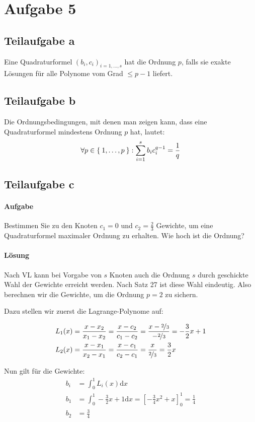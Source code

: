 \section*{Aufgabe 5}
\subsection*{Teilaufgabe a}
Eine Quadraturformel $(b_i, c_i)_{i=1, \dots, s}$ hat die Ordnung
$p$, falls sie exakte Lösungen für alle Polynome vom Grad $\leq p -1$
liefert.

\subsection*{Teilaufgabe b}
Die Ordnungsbedingungen, mit denen man zeigen kann, dass eine Quadraturformel
mindestens Ordnung $p$ hat, lautet:
\[\forall p \in \Set{1, \dots, p}: \sum_{i=1}^s b_i c_i^{q-1} = \frac{1}{q}\]

\subsection*{Teilaufgabe c}
\paragraph{Aufgabe} Bestimmen Sie zu den Knoten $c_1 = 0$ und $c_2 = \frac{2}{3}$ Gewichte, um eine Quadraturformel
maximaler Ordnung zu erhalten. Wie hoch ist die Ordnung?

\paragraph{Lösung}

Nach VL kann bei Vorgabe von $s$ Knoten auch die Ordnung $s$ durch
geschickte Wahl der Gewichte erreicht werden. Nach Satz 27 ist diese
Wahl eindeutig.
Also berechnen wir die Gewichte, um die Ordnung $p=2$ zu sichern.

Dazu stellen wir zuerst die Lagrange-Polynome auf:

\begin{align}
	L_1(x) &= \frac{x-x_2}{x_1 - x_2} = \frac{x-c_2}{c_1-c_2} = \frac{x-\nicefrac{2}{3}}{-\nicefrac{2}{3}} = -\frac{3}{2} x + 1\\
    L_2(x) &= \frac{x-x_1}{x_2 - x_1} = \frac{x-c_1}{c_2-c_1} = \frac{x}{\nicefrac{2}{3}} = \frac{3}{2} x
\end{align}

Nun gilt für die Gewichte:
\begin{align}
	b_i &= \int_0^1 L_i(x) \mathrm{d}x\\
	b_1 &= \int_0^1 -\frac{3}{2} x + 1 \mathrm{d}x = \left [ -\frac{3}{4}x^2 + x \right ]_0^1 = \frac{1}{4}\\
	b_2 &= \frac{3}{4}
\end{align}

